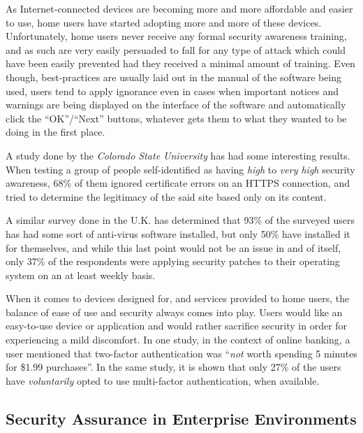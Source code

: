 \documentclass[a4paper,12pt]{article}
\begin{document}
	As Internet-connected devices are becoming more and more affordable and easier to use, home users have started adopting more and more of these devices. Unfortunately, home users never receive any formal security awareness training, and as such are very easily persuaded to fall for any type of attack which could have been easily prevented had they received a minimal amount of training. Even though, best-practices are usually laid out in the manual of the software being used, users tend to apply ignorance\cite{jnielsen12} even in cases when important notices and warnings are being displayed on the interface of the software and automatically click the ``OK''/``Next'' buttons, whatever gets them to what they wanted to be doing in the first place.
	
	A study done by the \textit{Colorado State University} has had some interesting\cite{ahowe12} results. When testing a group of people self-identified as having \textit{high} to \textit{very high} security awareness, 68\% of them ignored certificate errors on an HTTPS connection, and tried to determine the legitimacy of the said site based only on its content.
	
	A similar survey done in the U.K. has determined\cite{sfurnell07} that 93\% of the surveyed users has had some sort of anti-virus software installed, but only 50\% have installed it for themselves, and while this last point would not be an issue in and of itself, only 37\% of the respondents were applying security patches to their operating system on an at least weekly basis.
	
	When it comes to devices designed for, and services provided to home users, the balance of ease of use and security always comes into play. Users would like an easy-to-use device or application and would rather sacrifice security in order for experiencing a mild discomfort. In one study, in the context of online banking, a user mentioned that two-factor authentication was ``\textit{not} worth spending 5 minutes for \$1.99 purchases''\cite{ecrist14}. In the same study, it is shown that only 27\% of the users have \textit{voluntarily} opted to use multi-factor authentication, when available.
	
\subsection{Security Assurance in Enterprise Environments} \label{secassentenv}
 
\end{document}
